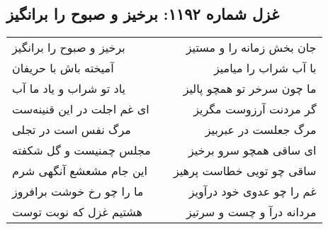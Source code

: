 \begin{center}
\section*{غزل شماره ۱۱۹۲: برخیز و صبوح را برانگیز}
\label{sec:1192}
\begin{longtable}{l p{0.5cm} r}
برخیز و صبوح را برانگیز
&&
جان بخش زمانه را و مستیز
\\
آمیخته باش با حریفان
&&
با آب شراب را میامیز
\\
یاد تو شراب و یاد ما آب
&&
ما چون سرخر تو همچو پالیز
\\
ای غم اجلت در این قنینه‌ست
&&
گر مردنت آرزوست مگریز
\\
مرگ نفس است در تجلی
&&
مرگ جعلست در عبربیز
\\
مجلس چمنیست و گل شکفته
&&
ای ساقی همچو سرو برخیز
\\
این جام مشعشع آنگهی شرم
&&
ساقی چو تویی خطاست پرهیز
\\
ما را چو رخ خوشت برافروز
&&
غم را چو عدوی خود درآویز
\\
هشتیم غزل که نوبت توست
&&
مردانه درآ و چست و سرتیز
\\
\end{longtable}
\end{center}
